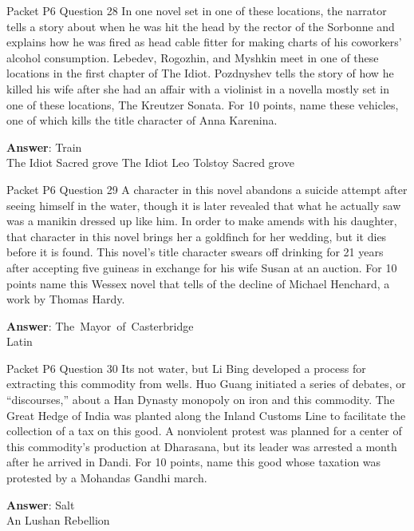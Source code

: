 \begin{frame}{Packet P6 Question 28}
In one novel set in one of these locations, the narrator tells a story about when he was hit the head by the rector of the Sorbonne and explains how he was fired as head cable fitter for making charts of his coworkers' alcohol   consumption. Lebedev, Rogozhin, and Myshkin meet in one   of these locations in the first chapter   of The Idiot. Pozdnyshev tells the story of how he killed his wife after she had an affair with a violinist in a novella mostly set in one of these locations, The Kreutzer Sonata. For 10 points, name these vehicles, one of which kills the title character of Anna Karenina.      

\textbf{Answer}: Train\\
 The Idiot
 Sacred grove
 The Idiot
 Leo Tolstoy
 Sacred grove
\end{frame}

\begin{frame}{Packet P6 Question 29}
A character in this novel   abandons a suicide attempt after seeing himself in the water, though it is later revealed that what he actually saw was a manikin dressed up like him. In order to make amends with his daughter, that character in this novel brings her a goldfinch for her wedding, but it dies before it is found. This novel's title character swears off drinking for 21 years after accepting five guineas in exchange     for his wife Susan at an auction. For   10 points name this Wessex novel that tells of  the decline of Michael Henchard,   a work by Thomas Hardy.

\textbf{Answer}: The\ Mayor\ of\ Casterbridge\\
 Latin
\end{frame}

\begin{frame}{Packet P6 Question 30}
Its not water, but Li   Bing developed a process for extracting this commodity from wells. Huo Guang initiated       a series of debates, or ``discourses,'' about a Han Dynasty monopoly on iron and this commodity. The Great Hedge of India was planted along the Inland Customs Line to facilitate the collection of a tax on this good. A nonviolent protest was planned for a center of this commodity's production at Dharasana, but its leader was arrested a month after he arrived in Dandi. For 10 points, name this good whose taxation was protested by a Mohandas   Gandhi march.

\textbf{Answer}: Salt\\
 An Lushan Rebellion
\end{frame}

